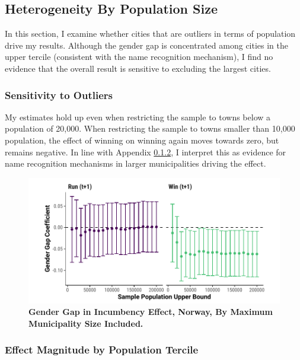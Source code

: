 \documentclass[12pt]{article}
\begin{document}


\clearpage
\subsection{Heterogeneity By Population Size}
\label{app:hetero_norway}

In this section, I examine whether cities that are outliers in terms of population drive my results. Although the gender gap is concentrated among cities in the upper tercile (consistent with the name recognition mechanism), I find no evidence that the overall result is sensitive to excluding the largest cities.

\subsubsection{Sensitivity to Outliers}
\label{app:norway_outliers}

My estimates hold up even when restricting the sample to towns below a population of 20,000. When restricting the sample to towns smaller than 10,000 population, the effect of winning on winning again moves towards zero, but remains negative. In line with Appendix \ref{app:effects_by_tercile}, I interpret this as evidence for name recognition mechanisms in larger municipalities driving the effect.

\begin{figure}[!htb]
    \centering
    \includegraphics[width = 0.8 \textwidth]{../output/figures/norway_muni_robust.pdf}
    \caption{\textbf{Gender Gap in Incumbency Effect, Norway, By Maximum Municipality Size Included.}}
    \label{fig:norway_outliers}
\end{figure}



\clearpage
\subsubsection{Effect Magnitude by Population Tercile}
\label{app:effects_by_tercile}
\end{document}
